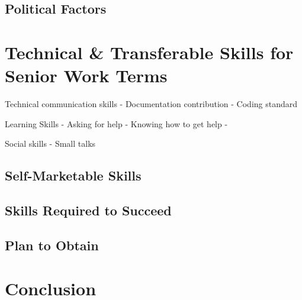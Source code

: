 \documentclass[10pt,letterpaper]{article}
\begin{document}
\subsection{Political Factors}

\section{Technical \& Transferable Skills for Senior Work Terms}\label{transferable-skills}

Technical communication skills
- Documentation contribution
- Coding standard

Learning Skills
- Asking for help
- Knowing how to get help
-

Social skills
- Small talks

\subsection{Self-Marketable Skills}

\subsection{Skills Required to Succeed}

\subsection{Plan to Obtain}

\section*{Conclusion}\label{conclusion}
\end{document}
